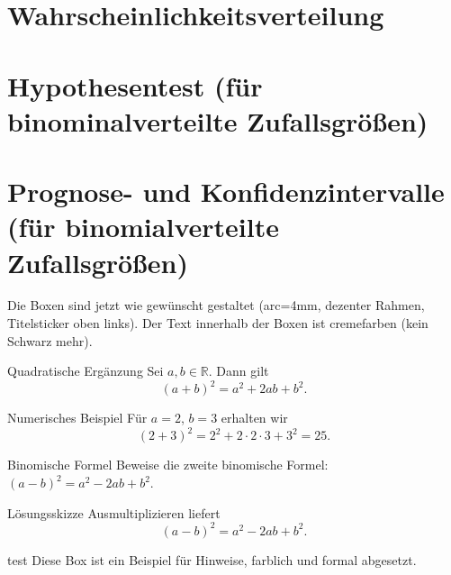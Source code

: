 \documentclass[11pt,a4paper,oneside]{article}
\begin{document}
	\section{Wahrscheinlichkeitsverteilung}
	
	\section{Hypothesentest (für binominalverteilte Zufallsgrößen)}
	
	\section{Prognose- und Konfidenzintervalle (für binomialverteilte Zufallsgrößen)}
	
	\newpage
	
	
	Die Boxen sind jetzt wie gewünscht gestaltet (arc=4mm, dezenter Rahmen, Titelsticker oben links). Der Text innerhalb der Boxen ist cremefarben (kein Schwarz mehr).
	
	\begin{theo}{Quadratische Ergänzung}
		Sei \(a,b\in \mathbb{R}\). Dann gilt
		\[
		(a+b)^2 = a^2 + 2ab + b^2.
		\]
	\end{theo}
	
	\begin{exem}{Numerisches Beispiel}
		Für \(a=2\), \(b=3\) erhalten wir
		\[
		(2+3)^2 = 2^2 + 2\cdot 2\cdot 3 + 3^2 = 25.
		\]
	\end{exem}
	
	\begin{aufgabe}{Binomische Formel}
		Beweise die zweite binomische Formel: \((a-b)^2 = a^2 - 2ab + b^2\).
	\end{aufgabe}
	
	\begin{loesung}{Lösungsskizze}
		Ausmultiplizieren liefert
		\[
		(a-b)^2 = a^2 - 2ab + b^2.
		\]
	\end{loesung}
	
	\begin{infobox}{test}
		Diese Box ist ein Beispiel für Hinweise, farblich und formal abgesetzt.
	\end{infobox}
	
\end{document}

